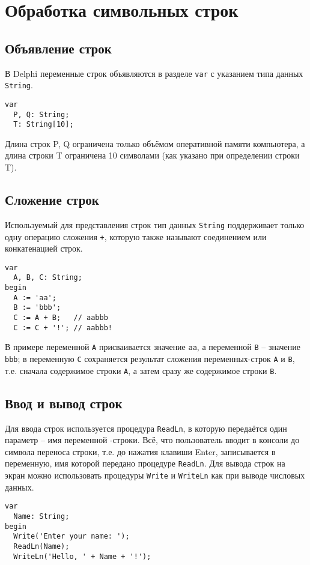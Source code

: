 \documentclass[12pt,a4paper]{report}
\begin{document}
\parindent=1cm
\pagestyle{empty}
\lstset{ language=Pascal, basicstyle=\small\ttfamily, numbers=left, numberstyle=\tiny, stepnumber=1, numbersep=5pt, extendedchars=\true, showstringspaces=false, breakatwhitespace=true, frame=single, keepspaces=true }

\clearpage
\section*{Обработка символьных строк}
\subsection*{Объявление строк}
В Delphi переменные строк объявляются в разделе \texttt{var} с указанием типа данных \texttt{String}.
\begin{verbatim}
var
  P, Q: String;   
  T: String[10]; 
\end{verbatim}
Длина строк P, Q ограничена только объёмом оперативной памяти компьютера, а длина строки T ограничена 10 символами (как указано при определении строки T).

\subsection*{Сложение строк}
Используемый для представления строк тип данных \texttt{String} поддерживает только одну операцию сложения \texttt{+}, которую также называют соединением или конкатенацией строк.
\begin{verbatim}
var
  A, B, C: String;
begin
  A := 'aa';
  B := 'bbb';
  C := A + B;   // aabbb
  C := C + '!'; // aabbb!
\end{verbatim}
В примере переменной \texttt{A} присваивается значение \texttt{aa}, а переменной \texttt{B} -- значение \texttt{bbb}; в переменную \texttt{С} сохраняется результат сложения переменных-строк \texttt{A} и \texttt{B}, т.е. сначала содержимое строки \texttt{A}, а затем сразу же содержимое строки \texttt{B}.

\subsection*{Ввод и вывод строк}
Для ввода строк используется процедура \texttt{ReadLn}, в которую передаётся один параметр -- имя переменной -строки. Всё, что пользователь вводит в консоли до символа переноса строки, т.е. до нажатия клавиши Enter, записывается в переменную, имя которой передано процедуре \texttt{ReadLn}.
Для вывода строк на экран можно использовать процедуры \texttt{Write} и \texttt{WriteLn} как при выводе числовых данных.
\begin{verbatim}
var
  Name: String;
begin
  Write('Enter your name: ');
  ReadLn(Name);
  WriteLn('Hello, ' + Name + '!');
\end{verbatim}
\end{document}
